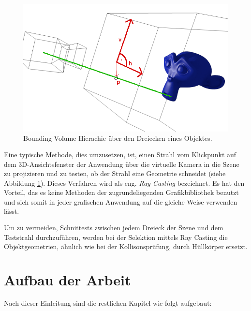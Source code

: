 \begin{figure}[H]
\centerline{
	\includegraphics[scale=0.7]{graphics/raypicking.png}
}
\caption{Bounding Volume Hierachie \"uber den Dreiecken eines Objektes.}
\label{rayPicking}
\end{figure}

Eine typische Methode, dies umzusetzen, ist, einen Strahl vom Klickpunkt auf dem 3D-Ansichtsfenster der Anwendung \"uber die virtuelle Kamera in die Szene zu projizieren und zu testen,  ob der Strahl eine Geometrie schneidet (siehe Abbildung \ref{rayPicking}).
Dieses Verfahren wird als eng. \textit{Ray Casting} bezeichnet. Es hat den Vorteil, das es keine Methoden der zugrundeliegenden Grafikbibliothek benutzt und sich somit in jeder grafischen Anwendung auf die gleiche Weise verwenden l\"asst.

Um zu vermeiden, Schnittests zwischen jedem Dreieck der Szene
und dem Teststrahl durchzuführen, werden bei der Selektion mittels Ray Casting die Objektgeometrien, \"ahnlich wie bei der Kollisonspr\"ufung, durch H\"ullk\"orper ersetzt.

\section{Aufbau der Arbeit}

Nach dieser Einleitung sind die restlichen Kapitel wie folgt aufgebaut:

